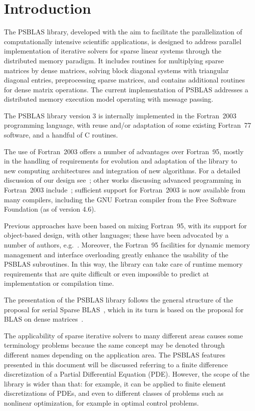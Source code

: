 \section{Introduction}\label{sec:intro}

The PSBLAS library, developed with the aim to facilitate the
parallelization of computationally intensive scientific applications,
is designed to address parallel implementation of iterative solvers
for sparse linear systems through the distributed memory paradigm.  It
includes routines for multiplying sparse matrices by dense matrices,
solving block diagonal systems with triangular diagonal entries,
preprocessing sparse matrices, and contains additional routines for
dense matrix operations.  The current implementation of PSBLAS
addresses a distributed memory execution model operating with message
passing. 

The PSBLAS library version 3 is internally implemented in
 the Fortran~2003~\cite{metcalf} programming language, with reuse and/or
 adaptation of some existing Fortran~77 software, and a handful of C
 routines. 

The use of Fortran~2003 offers a number of advantages over Fortran~95,
mostly in the handling of requirements for evolution and adaptation of
the library to new computing architectures and integration of
new algorithms. 
For a detailed discussion of our design see~\cite{Sparse03}; other
works discussing advanced programming in Fortran~2003
include~\cite{DesPat:11,RouXiaXu:11}; sufficient support for
Fortran~2003 is now available from many compilers, including the GNU
Fortran compiler from the Free Software Foundation (as of version 4.6). 


Previous approaches have been based on mixing Fortran~95, with its
support for object-based design, with other languages; these have
been advocated by a number of authors, 
e.g.~\cite{machiels}.  Moreover, the Fortran~95 facilities for dynamic
memory management and interface overloading greatly enhance the
usability of the PSBLAS 
subroutines. In this way, the library can take care of runtime memory
requirements that are quite difficult or even impossible to predict at
implementation or compilation time.  

The presentation of the
PSBLAS library follows the general structure of the proposal for
serial Sparse BLAS~\cite{sblas97,sblas02}, which in its turn is based on the
proposal for BLAS on dense matrices~\cite{BLAS1,BLAS2,BLAS3}.

The applicability of sparse iterative solvers to many different areas
causes some terminology problems because the same concept may be
denoted through different names depending on the application area. The
PSBLAS features presented in this document will be discussed referring
to a   finite difference discretization of a Partial Differential
Equation (PDE). However, the scope of the library is wider than
that: for example, it can be applied to finite element discretizations
of PDEs, and even to different classes of problems such as nonlinear
optimization, for example in optimal control problems.


